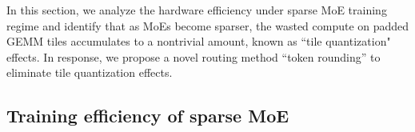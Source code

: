 
In this section, we analyze the hardware efficiency under sparse MoE training regime and identify that as MoEs become sparser, the wasted compute on padded GEMM tiles accumulates to a nontrivial amount, known as ``tile quantization" effects. In response, we propose a novel routing method ``token rounding'' to eliminate tile quantization effects.


\subsection{Training efficiency of sparse MoE}\label{sec:sparse_moe}


